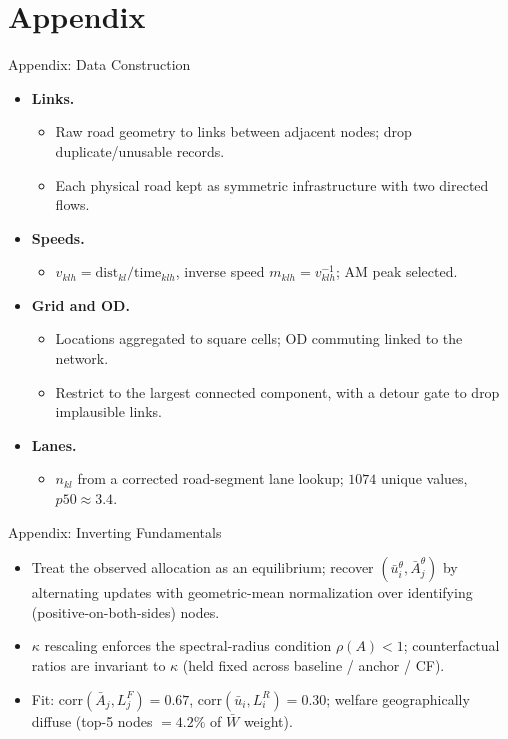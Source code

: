 \documentclass[11pt,aspectratio=169]{beamer}
\newcommand{\back}[1]{\hyperlink{#1}{\beamerreturnbutton{back}}}
\begin{document}
\section{Appendix}
\begin{frame}[label=appdata]{Appendix: Data Construction}
\begin{itemize}\small
  \item \textbf{Links.}
  \begin{itemize}\footnotesize
    \item Raw road geometry to links between adjacent nodes; drop duplicate/unusable records.
    \item Each physical road kept as symmetric infrastructure with two directed flows.
  \end{itemize}
  \item \textbf{Speeds.}
  \begin{itemize}\footnotesize
    \item $v_{klh}=\mathrm{dist}_{kl}/\mathrm{time}_{klh}$, inverse speed $m_{klh}=v_{klh}^{-1}$; AM peak selected.
  \end{itemize}
  \item \textbf{Grid and OD.}
  \begin{itemize}\footnotesize
    \item Locations aggregated to square cells; OD commuting linked to the network.
    \item Restrict to the largest connected component, with a detour gate to drop implausible links.
  \end{itemize}
  \item \textbf{Lanes.}
  \begin{itemize}\footnotesize
    \item $n_{kl}$ from a corrected road-segment lane lookup; $1074$ unique values, $p50\approx3.4$.
  \end{itemize}
\end{itemize}
\centering\back{data}
\end{frame}

\begin{frame}[label=appfund]{Appendix: Inverting Fundamentals}
\begin{itemize}\small
  \item Treat the observed allocation as an equilibrium; recover $(\bar u_i^\theta,\bar A_j^\theta)$ by alternating updates with geometric-mean normalization over identifying (positive-on-both-sides) nodes.
  \item $\kappa$ rescaling enforces the spectral-radius condition $\rho(A)<1$; counterfactual ratios are invariant to $\kappa$ (held fixed across baseline / anchor / CF).
  \item Fit: $\mathrm{corr}(\bar A_j,L_j^F)=0.67$, $\mathrm{corr}(\bar u_i,L_i^R)=0.30$; welfare geographically diffuse (top-5 nodes $=4.2\%$ of $\bar W$ weight).
\end{itemize}
\centering\back{data}
\end{frame}
\end{document}
